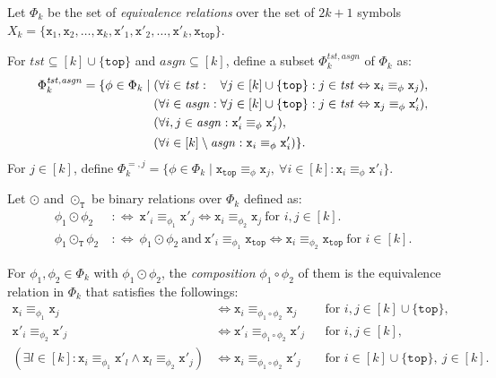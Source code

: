 \documentclass[oribibl,envcountsame,dvipdfmx]{llncs}
\renewcommand{\L}{\mathtt{x}}
\newcommand{\R}{\mathtt{x}'}
\newcommand{\TOP}{\mathtt{top}}
\newcommand{\LTOP}{\L_{\TOP}}
\newcommand{\COMP}{\circ}
\newcommand{\COMPBL}{\odot}
\newcommand{\COMPBLT}{\COMPBL_{\mathtt{T}}}
\newcommand{\TST}{\mathit{tst}}
\newcommand{\ASGN}{\mathit{asgn}}
\begin{document}
Let $\Phi_k$ be the set of
\emph{equivalence relations}
over the set of $2k+1$ symbols
$X_k=\{
 \L_1,\L_2,\ldots,\L_k,
 \R_1,\R_2,\ldots,\R_k,
 \LTOP \}$.

For $\TST\subseteq [k]\cup\{\TOP\}$ and $\ASGN\subseteq [k]$,
define a subset $\Phi_k^{\TST,\ASGN}$ of $\Phi_k$ as:
\[
  \Phi_k^{\TST,\ASGN} = \{ \phi\in\Phi_k \mid
    \begin{aligned}[t]
      & (\forall i\in\rlap{$\TST :{}$}\hphantom{\ASGN:{}}
      \forall j\in [k]\cup\{\TOP\} :
      j\in\TST \Leftrightarrow \L_i \equiv_{\phi} \L_j), \\
      & (\forall i\in\ASGN : \forall j\in [k]\cup\{\TOP\} :
      j\in\TST \Leftrightarrow \L_j \equiv_{\phi} \R_i), \\
      & (\forall i,j\in\ASGN :
      \R_i \equiv_{\phi} \R_j), \\
      & (\forall i\in [k]\setminus\ASGN :
      \L_i \equiv_{\phi} \R_i)\}.
    \end{aligned}
\]
For $j\in[k]$, define
\(
  \Phi_k^{=,j} = \{ \phi\in\Phi_k \mid
    \LTOP \equiv_{\phi} \L_j, \
    \forall i\in[k] : \L_i \equiv_{\phi} \R_i \}.
\)

Let $\COMPBL$ and $\COMPBLT$ be binary relations over $\Phi_k$ defined as:
\begin{align*}
  \phi_1\COMPBL\phi_2 \ &:\Leftrightarrow \
      \R_i \equiv_{\phi_1} \R_j \Leftrightarrow \L_i \equiv_{\phi_2} \L_j
      \ \text{for } i,j\in[k].
  \\
%
  \phi_1\COMPBLT\phi_2 \ &:\Leftrightarrow \
      \phi_1\COMPBL\phi_2 \ \text{and} \
      \R_i \equiv_{\phi_1} \LTOP \Leftrightarrow \L_i \equiv_{\phi_2} \LTOP
      \ \text{for } i\in[k].
\end{align*}

For $\phi_1,\phi_2\in\Phi_k$ with $\phi_1\COMPBL\phi_2$,
the \emph{composition} $\phi_1\COMP\phi_2$ of them
is the equivalence relation in $\Phi_k$ that satisfies the followings:
\begin{align*}
  \L_i \equiv_{\phi_1} \L_j &\Leftrightarrow
  \L_i \equiv_{\phi_1\COMP\phi_2} \L_j &&\text{for } i,j\in [k]\cup\{\TOP\},\\
  \R_i \equiv_{\phi_2} \R_j &\Leftrightarrow
  \R_i \equiv_{\phi_1\COMP\phi_2} \R_j &&\text{for } i,j\in [k],\\
  (\exists l\in [k] : \L_i \equiv_{\phi_1} \R_l \mathrel{\land}
  \L_l \equiv_{\phi_2} \R_j) &\Leftrightarrow
  \L_i \equiv_{\phi_1\COMP\phi_2} \R_j
  &&\text{for } i\in[k]\cup\{\TOP\},\ j\in [k].
\end{align*}
\end{document}
